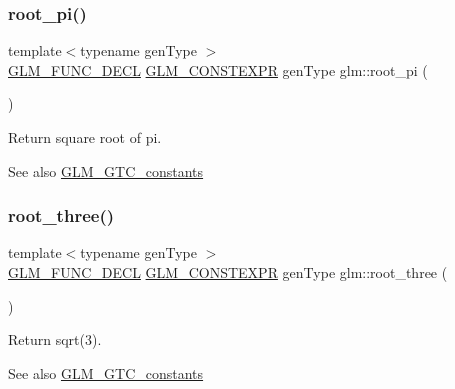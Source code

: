 \subsubsection{\texorpdfstring{root\+\_\+pi()}{root\_pi()}}
{\footnotesize\ttfamily template$<$typename gen\+Type $>$ \\
\hyperlink{setup_8hpp_ab2d052de21a70539923e9bcbf6e83a51}{G\+L\+M\+\_\+\+F\+U\+N\+C\+\_\+\+D\+E\+CL} \hyperlink{setup_8hpp_a08b807947b47031d3a511f03f89645ad}{G\+L\+M\+\_\+\+C\+O\+N\+S\+T\+E\+X\+PR} gen\+Type glm\+::root\+\_\+pi (\begin{DoxyParamCaption}{ }\end{DoxyParamCaption})}

Return square root of pi. \begin{DoxySeeAlso}{See also}
\hyperlink{group__gtc__constants}{G\+L\+M\+\_\+\+G\+T\+C\+\_\+constants} 
\end{DoxySeeAlso}
\mbox{\label{group__gtc__constants_ga4f286be4abe88be1eed7d2a9f6cb193e}} 
\subsubsection{\texorpdfstring{root\+\_\+three()}{root\_three()}}
{\footnotesize\ttfamily template$<$typename gen\+Type $>$ \\
\hyperlink{setup_8hpp_ab2d052de21a70539923e9bcbf6e83a51}{G\+L\+M\+\_\+\+F\+U\+N\+C\+\_\+\+D\+E\+CL} \hyperlink{setup_8hpp_a08b807947b47031d3a511f03f89645ad}{G\+L\+M\+\_\+\+C\+O\+N\+S\+T\+E\+X\+PR} gen\+Type glm\+::root\+\_\+three (\begin{DoxyParamCaption}{ }\end{DoxyParamCaption})}

Return sqrt(3). \begin{DoxySeeAlso}{See also}
\hyperlink{group__gtc__constants}{G\+L\+M\+\_\+\+G\+T\+C\+\_\+constants} 
\end{DoxySeeAlso}
\mbox{\label{group__gtc__constants_ga74e607d29020f100c0d0dc46ce2ca950}} 
